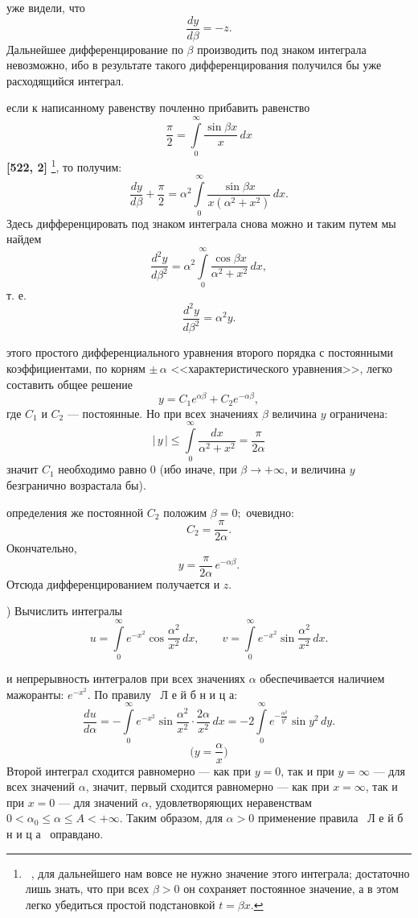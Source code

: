 \documentclass[12pt,a4paper]{book}
\begin{document}
\pagestyle{headings}
\setcounter{page}{730}

 уже видели, что
\[\frac{dy}{d\beta} = -z.\]
Дальнейшее дифференцирование по $\beta$ производить под знаком интеграла невозможно, ибо в результате такого дифференцирования получился бы уже расходящийся интеграл.

 если к написанному равенству почленно прибавить равенство
\[\frac{\pi}{2}=\int\limits_0^\infty{\frac{\sin{\beta x}}{x}}\,dx\]
{\bfseries[522, 2\textdegree]} \footnote{\ , для дальнейшего нам вовсе не нужно значение этого интеграла; достаточно лишь знать, что при всех $\beta>0$ он сохраняет постоянное значение, а в этом легко убедиться простой подстановкой $t=\beta x$.}, то получим:
\[\frac{dy}{d\beta} + \frac{\pi}{2} = \alpha^2 \int\limits_0^\infty{\frac{\sin{\beta x}}{x(\alpha^2 + x^2)}}\,dx.\]
Здесь дифференцировать под знаком интеграла снова можно и таким путем мы найдем
\[\frac{d^2 y}{d\beta^2} = \alpha^2 \int\limits_0^\infty{\frac{\cos{\beta x}}{\alpha^2 + x^2}}\,dx,\]
т. е.
\[\frac{d^2 y}{d\beta^2} = \alpha^2 y.\]

 этого простого дифференциального уравнения второго порядка с постоянными коэффициентами, по корням $\pm$\,$\alpha$ <<характеристического уравнения>>, легко составить общее решение
\[y=C_{1}e^{\alpha\beta}+C_{2}e^{-\alpha\beta},\]
где $C_1$ и $C_2$ --- постоянные. Но при всех значениях $\beta$ величина $y$ ограничена:
\[|\,{y}\,|\leqslant\int\limits_0^\infty {\frac{dx}{\alpha^2+x^2}} = \frac{\pi}{2\alpha}\]
значит $C_1$ необходимо равно 0 (ибо иначе, при $\beta \to + \infty$, и величина $y$ безгранично возрастала бы).

 определения же постоянной $C_2$ положим $\beta = 0;$ очевидно:
\[C_2 = \frac{\pi}{2\alpha}.\]
Окончательно,
\[y=\frac{\pi}{2\alpha}\,e^{-\alpha\beta}.\]
Отсюда дифференцированием получается и $z$.

) Вычислить интегралы
\[u = \int\limits_0^\infty{e^{-x^2}\cos{\frac{\alpha^2}{x^2}}}\,dx,\qquad
v = \int\limits_0^\infty{e^{-x^2}\sin{\frac{\alpha^2}{x^2}}}\,dx.\]

 и непрерывность интегралов при всех значениях $\alpha$ обеспечивается наличием мажоранты: $e^{-x^2}$. По правилу {\ Л е й б н и ц а}:
\[\frac{du}{d\alpha} = - \int\limits_0^\infty{e^{-x^2}\sin{\frac{\alpha^2}{x^2}}\cdot\frac{2\alpha}{x^2}}\,dx = -2 \int\limits_0^\infty{e^{-\frac{\alpha^2}{y^2}}\sin{y^2}}\,dy.\]
\[\Biggl(y=\frac\alpha x\Biggr)\]
Второй интеграл сходится равномерно --- как при $y=0$, так и при $y=\infty$ --- для всех значений $\alpha$, значит, первый сходится равномерно --- как при $x=\infty$, так и при $x=0$ --- для значений $\alpha$, удовлетворяющих неравенствам $0<\alpha_0\leqslant\alpha\leqslant A<+\infty$. Таким образом, для $\alpha>0$ применение правила {\ Л е й б н и ц а\ } оправдано.
\end{document}
